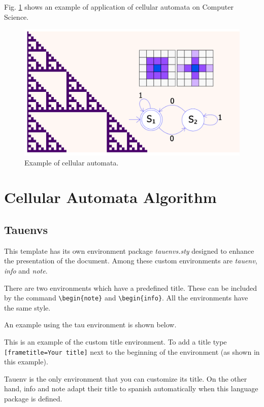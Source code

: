 \documentclass[9pt,a4paper,twoside]{tau-class/tau}
\begin{document}
        Fig. \ref{fig:figure} shows an example of application of cellular automata on Computer Science.
	\begin{figure}[H]
		\centering
		\includegraphics[width=0.75\columnwidth]{figures/theoryOfComputation.png}
		\caption{Example of cellular automata.}
		\label{fig:figure}
	\end{figure}
    \newpage

\section{Cellular Automata Algorithm}

    \subsection{Tauenvs}
	
        This template has its own environment package \textit{tauenvs.sty} designed to enhance the presentation of the document. Among these custom environments are \textit{tauenv}, \textit{info} and \textit{note}.
		
        There are two environments which have a predefined title. These can be included by the command \verb|\begin{note}| and \verb|\begin{info}|. All the environments have the same style.
			
        An example using the tau environment is shown below.
		
	\begin{tauenv}[frametitle=Environment with custom title]
            This is an example of the custom title environment. To add a title type \verb|[frametitle=Your title]| next to the beginning of the environment (as shown in this example).
	\end{tauenv}
		
        Tauenv is the only environment that you can customize its title. On the other hand, info and note adapt their title to spanish automatically when this language package is defined.
		
\end{document}
